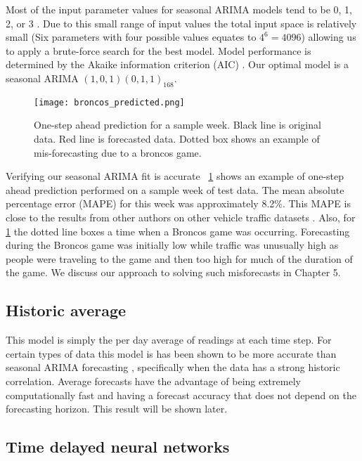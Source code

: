 Most of the input parameter values for seasonal ARIMA models tend to be 0, 1, 2, or 3 \cite{Box2008}.  Due to this small range of input values the total input space is relatively small (Six parameters with four possible values equates to $4^6 = 4096$) allowing us to apply a brute-force search for the best model.  Model performance is determined by the Akaike information criterion (AIC) \cite{Akaike1974}.  Our optimal model is a seasonal ARIMA $(1,0,1)(0,1,1)_{168}$.  

\begin{figure}[h]
\begin{center}
\texttt{[image: broncos\_predicted.png]}
\end{center}
\caption{One-step ahead prediction for a sample week.  Black line is original data.  Red line is forecasted data.  Dotted box shows an example of mis-forecasting due to a broncos game.}
\label{fig:arima_prediction}
\end{figure}

Verifying our seasonal ARIMA fit is accurate ~\ref{fig:arima_prediction} shows an example of one-step ahead prediction performed on a sample week of test data.  The mean absolute percentage error (MAPE) for this week was approximately 8.2\%.  This MAPE is close to the results from other authors on other vehicle traffic datasets \cite{Williams2003,Smith1997}.  Also, for \ref{fig:arima_prediction} the dotted line boxes a time when a Broncos game was occurring.  Forecasting during the Broncos game was initially low while traffic was unusually high as people were traveling to the game and then too high for much of the duration of the game.  We discuss our approach to solving such misforecasts in Chapter 5.


\subsection{Historic average}
This model is simply the per day average of readings at each time step.  For certain types of data this model is has been shown to be more accurate than seasonal ARIMA forecasting \cite{Newsham2010}, specifically when the data has a strong historic correlation.  Average forecasts have the advantage of being extremely computationally fast and having a forecast accuracy that does not depend on the forecasting horizon.  This result will be shown later.


\subsection{Time delayed neural networks}

